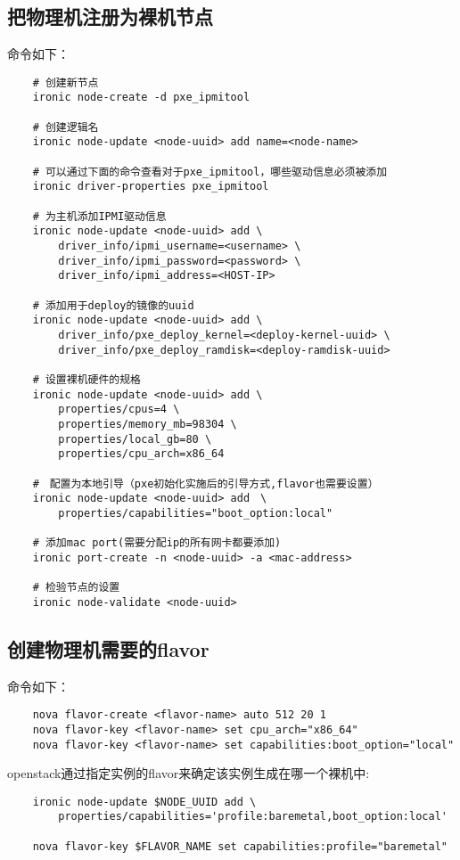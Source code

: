 \documentclass[a4paper,left=2.5cm,right=2.5cm,11pt]{article}
\begin{document}
\subsection{把物理机注册为裸机节点}
	命令如下：
	\begin{lstlisting}
	# 创建新节点
	ironic node-create -d pxe_ipmitool

	# 创建逻辑名
	ironic node-update <node-uuid> add name=<node-name>

	# 可以通过下面的命令查看对于pxe_ipmitool，哪些驱动信息必须被添加
	ironic driver-properties pxe_ipmitool

	# 为主机添加IPMI驱动信息
	ironic node-update <node-uuid> add \ 
		driver_info/ipmi_username=<username> \ 
		driver_info/ipmi_password=<password> \ 
		driver_info/ipmi_address=<HOST-IP>

	# 添加用于deploy的镜像的uuid
	ironic node-update <node-uuid> add \ 
		driver_info/pxe_deploy_kernel=<deploy-kernel-uuid> \ 
		driver_info/pxe_deploy_ramdisk=<deploy-ramdisk-uuid>

	# 设置裸机硬件的规格
	ironic node-update <node-uuid> add \
		properties/cpus=4 \ 
		properties/memory_mb=98304 \ 
		properties/local_gb=80 \ 
		properties/cpu_arch=x86_64

	#　配置为本地引导（pxe初始化实施后的引导方式,flavor也需要设置）
	ironic node-update <node-uuid> add　\
		properties/capabilities="boot_option:local"

	# 添加mac port(需要分配ip的所有网卡都要添加)
	ironic port-create -n <node-uuid> -a <mac-address>
	
	# 检验节点的设置
	ironic node-validate <node-uuid>
	\end{lstlisting}

\subsection{创建物理机需要的flavor}
	命令如下：
	\begin{lstlisting}
	nova flavor-create <flavor-name> auto 512 20 1
	nova flavor-key <flavor-name> set cpu_arch="x86_64"
	nova flavor-key <flavor-name> set capabilities:boot_option="local"
	\end{lstlisting}

	openstack通过指定实例的flavor来确定该实例生成在哪一个裸机中:
	\begin{lstlisting}
	ironic node-update $NODE_UUID add \ 
		properties/capabilities='profile:baremetal,boot_option:local'
	
	nova flavor-key $FLAVOR_NAME set capabilities:profile="baremetal"
	\end{lstlisting}
\end{document}
